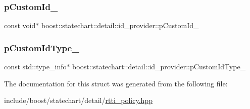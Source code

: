 \subsubsection{\texorpdfstring{p\+Custom\+Id\+\_\+}{pCustomId\_}}
{\footnotesize\ttfamily const void$\ast$ boost\+::statechart\+::detail\+::id\+\_\+provider\+::p\+Custom\+Id\+\_\+}

\mbox{\label{structboost_1_1statechart_1_1detail_1_1id__provider_ae107cfa5cafc5282feb7636b2dc4ad74}} 
\subsubsection{\texorpdfstring{p\+Custom\+Id\+Type\+\_\+}{pCustomIdType\_}}
{\footnotesize\ttfamily const std\+::type\+\_\+info$\ast$ boost\+::statechart\+::detail\+::id\+\_\+provider\+::p\+Custom\+Id\+Type\+\_\+}



The documentation for this struct was generated from the following file\+:\begin{DoxyCompactItemize}
\item 
include/boost/statechart/detail/\mbox{\hyperlink{rtti__policy_8hpp}{rtti\+\_\+policy.\+hpp}}\end{DoxyCompactItemize}
